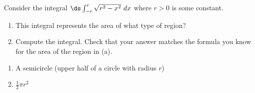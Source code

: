{Consider the integral $\ds \int_{-r}^r \sqrt{r^2-x^2}\ dx$ where $r>0$ is some constant.
\begin{enumerate}
\item This integral represents the area of what type of region?
\item Compute the integral.  Check that your answer matches the formula you know for the area of the region in (a).
\end{enumerate}
}
{\begin{enumerate}
\item A semicircle (upper half of a circle with radius $r$)
\item $\frac{1}{2}\pi r^2$
\end{enumerate}
}